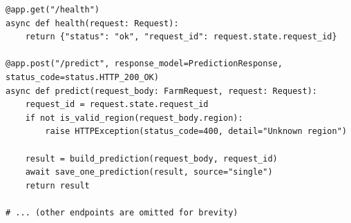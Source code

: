 \documentclass[12pt,a4paper]{article}
\begin{document}
\begin{lstlisting}[caption={main.py}]
@app.get("/health")
async def health(request: Request):
    return {"status": "ok", "request_id": request.state.request_id}

@app.post("/predict", response_model=PredictionResponse, status_code=status.HTTP_200_OK)
async def predict(request_body: FarmRequest, request: Request):
    request_id = request.state.request_id
    if not is_valid_region(request_body.region):
        raise HTTPException(status_code=400, detail="Unknown region")

    result = build_prediction(request_body, request_id)
    await save_one_prediction(result, source="single")
    return result

# ... (other endpoints are omitted for brevity)
\end{lstlisting}
\end{document}
